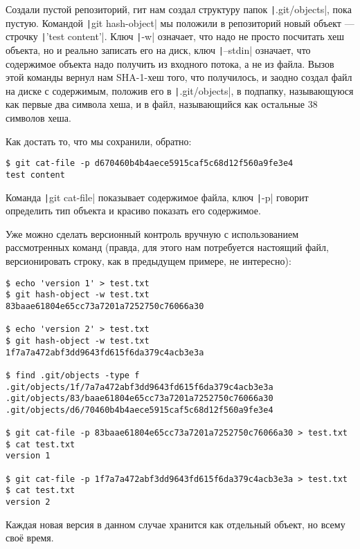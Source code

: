 \documentclass[a5paper]{article}
\begin{document}
Создали пустой репозиторий, гит нам создал структуру папок \texttt|.git/objects|, пока пустую. Командой \texttt|git hash-object| мы положили в репозиторий новый объект --- строчку \texttt|'test content'|. Ключ \texttt|-w| означает, что надо не просто посчитать хеш объекта, но и реально записать его на диск, ключ \texttt|--stdin| означает, что содержимое объекта надо получить из входного потока, а не из файла. Вызов этой команды вернул нам SHA-1-хеш того, что получилось, и заодно создал файл на диске с содержимым, положив его в \texttt|.git/objects|, в подпапку, называющуюся как первые два символа хеша, и в файл, называющийся как остальные 38 символов хеша.

Как достать то, что мы сохранили, обратно:
\begin{verbatim}
$ git cat-file -p d670460b4b4aece5915caf5c68d12f560a9fe3e4
test content
\end{verbatim}

Команда \texttt|git cat-file| показывает содержимое файла, ключ \texttt|-p| говорит определить тип объекта и красиво показать его содержимое.

Уже можно сделать версионный контроль вручную с использованием рассмотренных команд (правда, для этого нам потребуется настоящий файл, версионировать строку, как в предыдущем примере, не интересно):

\begin{verbatim}
$ echo 'version 1' > test.txt
$ git hash-object -w test.txt
83baae61804e65cc73a7201a7252750c76066a30

$ echo 'version 2' > test.txt
$ git hash-object -w test.txt
1f7a7a472abf3dd9643fd615f6da379c4acb3e3a

$ find .git/objects -type f
.git/objects/1f/7a7a472abf3dd9643fd615f6da379c4acb3e3a
.git/objects/83/baae61804e65cc73a7201a7252750c76066a30
.git/objects/d6/70460b4b4aece5915caf5c68d12f560a9fe3e4

$ git cat-file -p 83baae61804e65cc73a7201a7252750c76066a30 > test.txt
$ cat test.txt
version 1

$ git cat-file -p 1f7a7a472abf3dd9643fd615f6da379c4acb3e3a > test.txt
$ cat test.txt
version 2
\end{verbatim}

Каждая новая версия в данном случае хранится как отдельный объект, но всему своё время.
\end{document}

